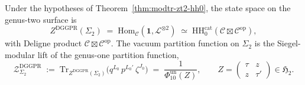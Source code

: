 \begin{theorem}
\label{thm:modtr-zsigma2-phi10}
Under the hypotheses of Theorem~\ref{thm:modtr-zt2-hh0}, the
state space on the genus-two surface is
\[
 Z^{\mathrm{DGGPR}}(\Sigma_2)
 \;=\;
 \mathrm{Hom}_{\mathcal C}(\mathbf 1, \mathcal L^{\otimes 2})
 \;\simeq\;
 \mathrm{HH}_0^{\mathrm{cat}}(\mathcal C\boxtimes\mathcal C^{\mathrm{op}}),
\]
with Deligne product $\mathcal C\boxtimes\mathcal C^{\mathrm{op}}$.
The vacuum partition function on $\Sigma_2$ is the Siegel-modular lift
of the genus-one partition function,
\[
 \boxed{\;
 \mathcal Z^{\mathrm{DGGPR}}_{\Sigma_2}
 \;:=\;
 \mathrm{Tr}_{Z^{\mathrm{DGGPR}}(\Sigma_2)}\!
 \bigl(q^{L_0}\,p^{L_0'}\,\zeta^{J_0}\bigr)
 \;=\;
 \frac{1}{\Phi_{10}^{\mathrm{un}}(Z)},
 \qquad
 Z = \begin{pmatrix}\tau & z\\ z & \tau'\end{pmatrix}\in\mathfrak H_2.\;}
\]
\end{theorem}

